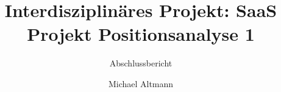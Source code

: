 \documentclass[
  a4paper,            %
  thesis=none,     %
  german,            %
  titlepage=false,    %
  oneside,            %
]{tumbook}
\title{Interdisziplinäres Projekt: SaaS Projekt Positionsanalyse 1
}
\subtitle{Abschlussbericht}
\author{Michael Altmann}
\begin{document}



\maketitle
% 
\tableofcontents








\backmatter
\listoffigures{}

\printbibliography{}
\end{document}
